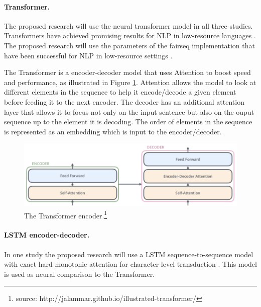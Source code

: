 \paragraph{Transformer.} The proposed research will use the neural transformer model \citep{vaswani_attention_2017} in all three studies. Transformers have achieved promising results for NLP in low-resource languages \citep{abbott_towards_2018,Martinus2019AFO}. 
The proposed research will use the parameters of the fairseq \citep{ott2019fairseq} implementation that have been successful for NLP in low-resource settings \citep{wu2020applying}.


The Transformer is a encoder-decoder model that uses Attention to boost speed and performance, as illustrated in Figure \ref{fig:transformer}. Attention allows the model to look at different elements in the sequence to help it encode/decode a given element before feeding it to the next encoder. The decoder has an additional attention layer that allows it to focus not only on the input sentence but also on the ouput sequence up to the element it is decoding. The order of elements in the sequence is represented as an embedding which is input to the encoder/decoder. 

\begin{figure}
    \centering
    \includegraphics[width=14cm]{figs/Transformer_simplified.png}
    \caption[Transformer]{The Transformer encoder.\footnote{source: http://jalammar.github.io/illustrated-transformer/}}
    \label{fig:transformer}
\end{figure}

\paragraph{LSTM encoder-decoder.} In one study the proposed research will use a LSTM sequence-to-sequence model with exact hard monotonic attention for character-level transduction \citep{wu-cotterell-2019-exact}. This model is used as neural comparison to the Transformer. 

